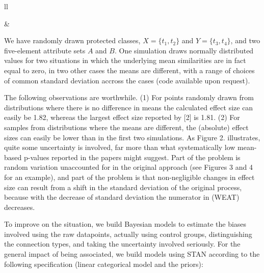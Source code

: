 \documentclass[12pt,dvipsnames,enabledeprecatedfontcommands]{scrartcl}
\begin{document}
\begin{tabular}{ll}
\begin{minipage}[c]{0.35\linewidth}
\end{minipage}& \begin{minipage}[c]{0.6\linewidth}

We have randomly drawn protected classes, $X=\{t_1,t_2\}$ and $Y=\{t_3,t_4\}$, and two five-element attribute sets $A$ and $B$. One simulation draws normally distributed values  for two situations in which the underlying mean similarities are in fact equal to zero, in two other cases  the means are different, with a range of choices of common standard deviation  accross the cases (code available upon request).

\end{minipage}
\end{tabular}

\vspace{1mm}

The following observations are worthwhile. (1) For points randomly drawn
from distributions where there is no difference in means the calculated
effect size can easily be 1.82, whereas the largest effect size reported
by {[}2{]} is 1.81. (2) For samples from distributions where the means
are different, the (absolute) effect sizes can easily be lower than in
the first two simulations. As Figure 2. illustrates, quite some
uncertainty is involved, far more than what systematically low
mean-based p-values reported in the papers might suggest. Part of the
problem is random variation unaccounted for in the original approach
(see Figures 3 and 4 for an example), and part of the problem is that
non-negligible changes in effect size can result from a shift in the
standard deviation of the original process, because with the decrease of
standard deviation the numerator in (WEAT) decreases.

To improve on the situation, we build Bayesian models to estimate the
biases involved using the raw datapoints, actually using control groups,
distinguishing the connection types, and taking the uncertainty involved
seriously. For the general impact of being associated, we build models
using STAN according to the following specification (linear categorical
model and the priors):
\end{document}
